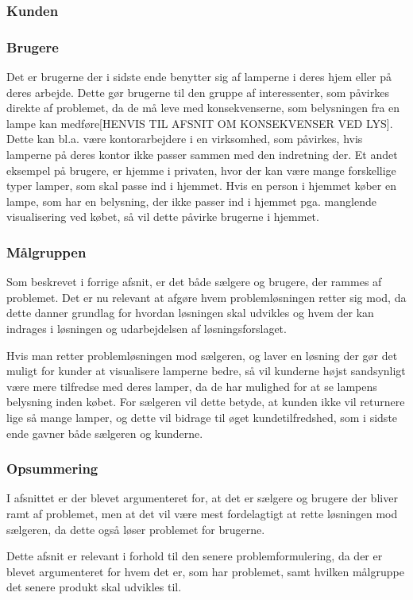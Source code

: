 \subsubsection{Kunden}

\subsubsection{Brugere}
Det er brugerne der i sidste ende benytter sig af lamperne i deres hjem eller på deres arbejde. Dette gør brugerne til den gruppe af interessenter, som påvirkes direkte af problemet, da de må leve med konsekvenserne, som belysningen fra en lampe kan medføre[HENVIS TIL AFSNIT OM KONSEKVENSER VED LYS]. Dette kan bl.a. være kontorarbejdere i en virksomhed, som påvirkes, hvis lamperne på deres kontor ikke passer sammen med den indretning der. Et andet eksempel på brugere, er hjemme i privaten, hvor der kan være mange forskellige typer lamper, som skal passe ind i hjemmet. Hvis en person i hjemmet køber en lampe, som har en belysning, der ikke passer ind i hjemmet pga. manglende visualisering ved købet, så vil dette påvirke brugerne i hjemmet. 

\subsubsection{Målgruppen}
Som beskrevet i forrige afsnit, er det både sælgere og brugere, der rammes af problemet. Det er nu relevant at afgøre hvem problemløsningen retter sig mod, da dette danner grundlag for hvordan løsningen skal udvikles og hvem der kan indrages i løsningen og udarbejdelsen af løsningsforslaget. 


Hvis man retter problemløsningen mod sælgeren, og laver en løsning der gør det muligt for kunder at visualisere lamperne bedre, så vil kunderne højst sandsynligt være mere tilfredse med deres lamper, da de har mulighed for at se lampens belysning inden købet. For sælgeren vil dette betyde, at kunden ikke vil returnere lige så mange lamper, og dette vil bidrage til øget kundetilfredshed, som i sidste ende gavner både sælgeren og kunderne.

\subsubsection*{Opsummering}
I afsnittet er der blevet argumenteret for, at det er sælgere og brugere der bliver ramt af problemet, men at det vil være mest fordelagtigt at rette løsningen mod sælgeren, da dette også løser problemet for brugerne.

Dette afsnit er relevant i forhold til den senere problemformulering, da der er blevet argumenteret for hvem det er, som har problemet, samt hvilken målgruppe det senere produkt skal udvikles til.
